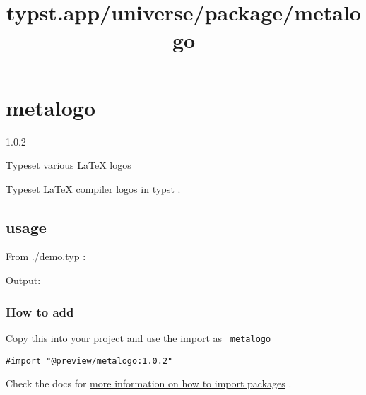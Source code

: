 \title{typst.app/universe/package/metalogo}

\label{banner}
\section{metalogo}\label{metalogo}

{ 1.0.2 }

Typeset various LaTeX logos

\label{readme}
Typeset LaTeX compiler logos in
\href{https://github.com/typst/typst}{typst} .

\subsection{usage}\label{usage}

From
\href{https://github.com/typst/packages/raw/main/packages/preview/metalogo/1.0.2/demo.typ}{./demo.typ}
:

\begin{Shaded}
\begin{Highlighting}[]


\end{Highlighting}
\end{Shaded}

Output:

\pandocbounded{}

\subsubsection{How to add}\label{how-to-add}

Copy this into your project and use the import as \texttt{\ metalogo\ }

\begin{verbatim}
#import "@preview/metalogo:1.0.2"
\end{verbatim}



Check the docs for
\href{https://typst.app/docs/reference/scripting/\#packages}{more
information on how to import packages} .

